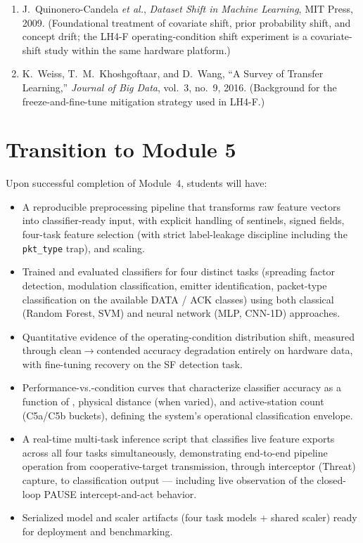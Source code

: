 \documentclass[11pt,letterpaper]{article}
\begin{document}
	\begin{enumerate}[leftmargin=2em]
		\item J.\ Quinonero-Candela \textit{et al.}, \textit{Dataset Shift in Machine Learning}, MIT Press, 2009. (Foundational treatment of covariate shift, prior probability shift, and concept drift; the LH4-F operating-condition shift experiment is a covariate-shift study within the same hardware platform.)
		\item K.\ Weiss, T.\ M.\ Khoshgoftaar, and D.\ Wang, ``A Survey of Transfer Learning,'' \textit{Journal of Big Data}, vol.~3, no.~9, 2016. (Background for the freeze-and-fine-tune mitigation strategy used in LH4-F.)
	\end{enumerate}

	\newpage
	\section{Transition to Module 5}

	Upon successful completion of Module~4, students will have:
	\begin{itemize}[leftmargin=2em]
		\item A reproducible preprocessing pipeline that transforms raw \FPGA{} feature vectors into classifier-ready input, with explicit handling of sentinels, signed fields, four-task feature selection (with strict label-leakage discipline including the \texttt{pkt\_type} trap), and scaling.
		\item Trained and evaluated classifiers for four distinct tasks (spreading factor detection, modulation classification, emitter identification, packet-type classification on the available DATA / ACK classes) using both classical \ML{} (Random Forest, SVM) and neural network (MLP, CNN-1D) approaches.
		\item Quantitative evidence of the operating-condition distribution shift, measured through clean$\to$contended accuracy degradation entirely on hardware data, with fine-tuning recovery on the SF detection task.
		\item Performance-vs.-condition curves that characterize classifier accuracy as a function of \SNR{}, physical distance (when varied), and active-station count (C5a/C5b buckets), defining the system's operational classification envelope.
		\item A real-time multi-task inference script that classifies live \FPGA{} feature exports across all four tasks simultaneously, demonstrating end-to-end pipeline operation from cooperative-target \RF{} transmission, through interceptor (Threat) capture, to classification output --- including live observation of the closed-loop PAUSE intercept-and-act behavior.
		\item Serialized model and scaler artifacts (four task models + shared scaler) ready for deployment and benchmarking.
	\end{itemize}
\end{document}
